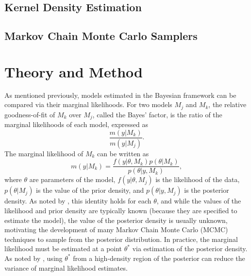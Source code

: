 \documentclass[twocolumn]{article}
\begin{document}
\subsection{Kernel Density Estimation}


\subsection{Markov Chain Monte Carlo Samplers}

\section{Theory and Method}

As mentioned previously, models estimated in the Bayesian framework can be compared via their marginal likelihoods. For two models $M_j$ and $M_k$, the relative goodness-of-fit of $M_k$ over $M_j$, called the Bayes' factor, is the ratio of the marginal likelihoods of each model, expressed as
\begin{equation}
	\frac{m(y|M_k)}{m(y|M_j)}.
\end{equation}
The marginal likelihood of $M_k$ can be written as
\begin{equation}
	m(y|M_k) = \frac{f(y|\theta, M_k)p(\theta|M_k)}{p(\theta|y, M_k)},
\end{equation}
where $\theta$ are parameters of the model, $f(y|\theta, M_j)$ is the likelihood of the data, $p(\theta|M_j)$ is the value of the prior density, and $p(\theta|y, M_j)$ is the posterior density. As noted by \cite{Chib}, this identity holds for each $\theta$, and while the values of the likelihood and prior density are typically known (because they are specified to estimate the model), the value of the posterior density is usually unknown, motivating the development of many Markov Chain Monte Carlo (MCMC) techniques to sample from the posterior distribution. In practice, the marginal likelihood must be estimated at a point $\theta^*$ via estimation of the posterior density. As noted by \cite{Chib}, using $\theta^*$ from a high-density region of the posterior can reduce the variance of marginal likelihood estimates.
\end{document}
